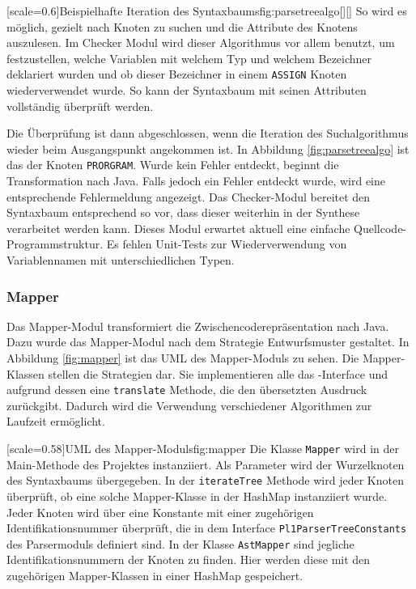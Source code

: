 [scale=0.6]{Beispielhafte Iteration des Syntaxbaums}{fig:parsetreealgo}[][]
\pagebreak
So wird es möglich, gezielt nach Knoten zu suchen und die Attribute des Knotens auszulesen.
Im Checker Modul wird dieser Algorithmus vor allem benutzt, um festzustellen, welche Variablen mit welchem Typ und welchem Bezeichner deklariert wurden und ob dieser Bezeichner in einem \verb+ASSIGN+ Knoten wiederverwendet wurde. So kann der Syntaxbaum mit seinen Attributen vollständig überprüft werden.

Die Überprüfung ist dann abgeschlossen, wenn die Iteration des Suchalgorithmus wieder beim Ausgangspunkt angekommen ist. In Abbildung \ref{fig:parsetreealgo} ist das der Knoten \verb+PRORGRAM+. Wurde kein Fehler entdeckt, beginnt die Transformation nach Java. Falls jedoch ein Fehler entdeckt wurde, wird eine entsprechende Fehlermeldung angezeigt. Das Checker-Modul bereitet den Syntaxbaum entsprechend so vor, dass dieser weiterhin in der Synthese verarbeitet werden kann. Dieses Modul erwartet aktuell eine einfache Quellcode-Programmstruktur. Es fehlen Unit-Tests zur Wiederverwendung von Variablennamen mit unterschiedlichen Typen.
 
 
\subsubsection{Mapper}
Das Mapper-Modul transformiert die Zwischencoderepräsentation nach Java. Dazu wurde das Mapper-Modul nach dem Strategie Entwurfsmuster gestaltet.
In Abbildung \ref{fig:mapper} ist das UML des Mapper-Moduls zu sehen. 
Die Mapper-Klassen stellen die Strategien dar. Sie implementieren alle das -Interface und aufgrund dessen eine \verb+translate+ Methode, die den übersetzten Ausdruck zurückgibt. Dadurch wird die Verwendung verschiedener Algorithmen zur Laufzeit ermöglicht. 

[scale=0.58]{UML des Mapper-Moduls}{fig:mapper}
\pagebreak
Die Klasse \verb+Mapper+ wird in der Main-Methode des Projektes instanziiert. Als Parameter wird der Wurzelknoten des Syntaxbaums übergegeben.
In der \verb+iterateTree+ Methode wird jeder Knoten überprüft, ob eine solche Mapper-Klasse in der HashMap instanziiert wurde.
Jeder Knoten wird über eine Konstante mit einer zugehörigen Identifikationsnummer überprüft, die in dem Interface \verb+Pl1ParserTreeConstants+ des Parsermoduls definiert sind. 
In der Klasse \verb+AstMapper+ sind jegliche Identifikationsnummern der Knoten zu finden. Hier werden diese mit den zugehörigen Mapper-Klassen in einer HashMap gespeichert.

